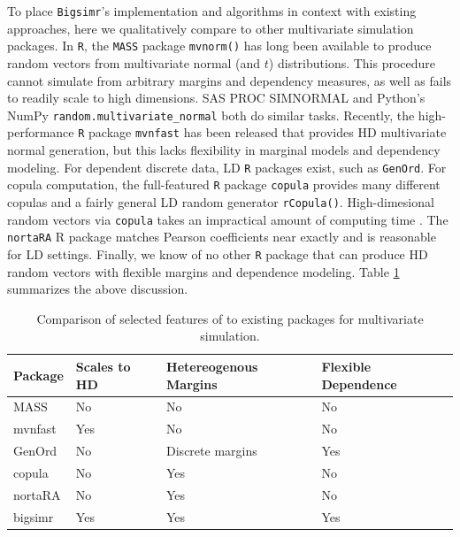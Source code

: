 \documentclass[
]{jss}
\begin{document}
To place \texttt{Bigsimr}'s implementation and algorithms in context with existing approaches, here we qualitatively compare to other multivariate simulation packages. In \texttt{R}, the \texttt{MASS} package \texttt{mvnorm()} has long been available to produce random vectors from multivariate normal (and \(t\)) distributions. This procedure cannot simulate from arbitrary margins and dependency measures, as well as fails to readily scale to high dimensions. SAS PROC SIMNORMAL and Python's NumPy \texttt{random.multivariate\_normal} both do similar tasks. Recently, the high-performance \texttt{R} package \texttt{mvnfast} \citep{Fasiolo2016} has been released that provides HD multivariate normal generation, but this lacks flexibility in marginal models and dependency modeling. For dependent discrete data, LD \texttt{R} packages exist, such as \texttt{GenOrd}. For copula computation, the full-featured \texttt{R} package \texttt{copula} provides many different copulas and a fairly general LD random generator \texttt{rCopula()}. High-dimesional random vectors via \texttt{copula} takes an impractical amount of computing time \citep{Li2019gpu}. The \texttt{nortaRA} R package matches Pearson coefficients near exactly and is reasonable for LD settings. Finally, we know of no other \texttt{R} package that can produce HD random vectors with flexible margins and dependence modeling. Table \ref{tab:compare-table} summarizes the above discussion.

\begin{table}[h]
\centering
\caption{\label{tab:compare-table}Comparison of selected features of  to existing packages for multivariate simulation.}
\begin{tabular}{@{}llll@{}}
Package & Scales to HD & Hetereogenous Margins & Flexible Dependence \\ \midrule
MASS      & No           & No                    & No                  \\
mvnfast   & Yes          & No                    & No                  \\
GenOrd    & No           & Discrete margins      & Yes                 \\
copula    & No           & Yes                   & No                  \\
nortaRA   & No           & Yes                   & No                  \\
bigsimr   & Yes          & Yes                   & Yes                
\end{tabular}
\end{table}
\end{document}
